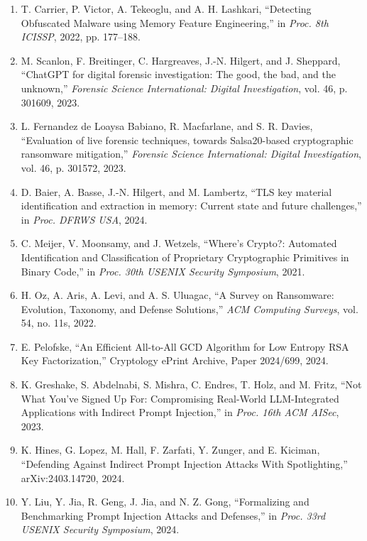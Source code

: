 \documentclass[10pt]{article}
\begin{document}
\begin{enumerate}
\item T. Carrier, P. Victor, A. Tekeoglu, and A. H. Lashkari, ``Detecting Obfuscated Malware using Memory Feature Engineering,'' in \emph{Proc. 8th ICISSP}, 2022, pp. 177--188.
\item M. Scanlon, F. Breitinger, C. Hargreaves, J.-N. Hilgert, and J. Sheppard, ``ChatGPT for digital forensic investigation: The good, the bad, and the unknown,'' \emph{Forensic Science International: Digital Investigation}, vol. 46, p. 301609, 2023.
\item L. Fernandez de Loaysa Babiano, R. Macfarlane, and S. R. Davies, ``Evaluation of live forensic techniques, towards Salsa20-based cryptographic ransomware mitigation,'' \emph{Forensic Science International: Digital Investigation}, vol. 46, p. 301572, 2023.
\item D. Baier, A. Basse, J.-N. Hilgert, and M. Lambertz, ``TLS key material identification and extraction in memory: Current state and future challenges,'' in \emph{Proc. DFRWS USA}, 2024.
\item C. Meijer, V. Moonsamy, and J. Wetzels, ``Where's Crypto?: Automated Identification and Classification of Proprietary Cryptographic Primitives in Binary Code,'' in \emph{Proc. 30th USENIX Security Symposium}, 2021.
\item H. Oz, A. Aris, A. Levi, and A. S. Uluagac, ``A Survey on Ransomware: Evolution, Taxonomy, and Defense Solutions,'' \emph{ACM Computing Surveys}, vol. 54, no. 11s, 2022.
\item E. Pelofske, ``An Efficient All-to-All GCD Algorithm for Low Entropy RSA Key Factorization,'' Cryptology ePrint Archive, Paper 2024/699, 2024.
\item K. Greshake, S. Abdelnabi, S. Mishra, C. Endres, T. Holz, and M. Fritz, ``Not What You've Signed Up For: Compromising Real-World LLM-Integrated Applications with Indirect Prompt Injection,'' in \emph{Proc. 16th ACM AISec}, 2023.
\item K. Hines, G. Lopez, M. Hall, F. Zarfati, Y. Zunger, and E. Kiciman, ``Defending Against Indirect Prompt Injection Attacks With Spotlighting,'' arXiv:2403.14720, 2024.
\item Y. Liu, Y. Jia, R. Geng, J. Jia, and N. Z. Gong, ``Formalizing and Benchmarking Prompt Injection Attacks and Defenses,'' in \emph{Proc. 33rd USENIX Security Symposium}, 2024.
\end{enumerate}
\end{document}
